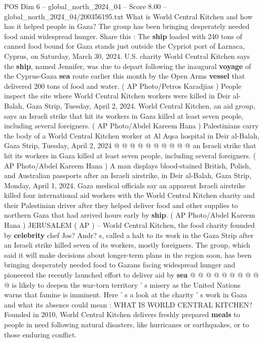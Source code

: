 \begin{textsample}{POS Dim 6 – global\_north\_2024\_04 – Score 8.00 – global\_north\_2024\_04/200356195.txt}  \label{ex:f6_pos_115}
What is World Central Kitchen and how has it helped people in Gaza?
The group has been bringing desperately needed food amid widespread hunger.
Share this : The \textbf{ship} loaded with 240 tons of canned food bound for Gaza stands just outside the Cypriot port of Larnaca, Cyprus, on Saturday, March 30, 2024.
U.S. charity World Central Kitchen says the \textbf{ship}, named Jennifer, was due to depart following the inaugural \textbf{voyage} of the Cyprus-Gaza \textbf{sea} route earlier this month by the Open Arms \textbf{vessel} that delivered 200 tons of food and water. ( AP Photo/Petros Karadjias ) People inspect the site where World Central Kitchen workers were killed in Deir al-Balah, Gaza Strip, Tuesday, April 2, 2024.
World Central Kitchen, an aid group, says an Israeli strike that hit its workers in Gaza killed at least seven people, including several foreigners. ( AP Photo/Abdel Kareem Hana ) Palestinians carry the body of a World Central Kitchen worker at Al Aqsa hospital in Deir al-Balah, Gaza Strip, Tuesday, April 2, 2024 @ @ @ @ @ @ @ @ @ @ an Israeli strike that hit its workers in Gaza killed at least seven people, including several foreigners. ( AP Photo/Abdel Kareem Hana ) A man displays blood-stained British, Polish, and Australian passports after an Israeli airstrike, in Deir al-Balah, Gaza Strip, Monday, April 1, 2024.
Gaza medical officials say an apparent Israeli airstrike killed four international aid workers with the World Central Kitchen charity and their Palestinian driver after they helped deliver food and other supplies to northern Gaza that had arrived hours early by \textbf{ship}. ( AP Photo/Abdel Kareem Hana ) JERUSALEM ( AP ) -- World Central Kitchen, the food charity founded by \textbf{celebrity} chef Jos?
Andr? s, called a halt to its work in the Gaza Strip after an Israeli strike killed seven of its workers, mostly foreigners.
The group, which said it will make decisions about longer-term plans in the region soon, has been bringing desperately needed food to Gazans facing widespread hunger and pioneered the recently launched effort to deliver aid by \textbf{sea} @ @ @ @ @ @ @ @ @ @ is likely to deepen the war-torn territory ' s misery as the United Nations warns that famine is imminent.
Here ' s a look at the charity ' s work in Gaza and what its absence could mean : WHAT IS WORLD CENTRAL KITCHEN?
Founded in 2010, World Central Kitchen delivers freshly prepared \textbf{meals} to people in need following natural disasters, like hurricanes or earthquakes, or to those enduring conflict.

\end{textsample}
